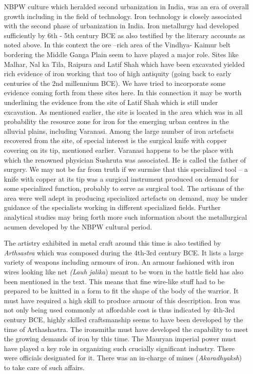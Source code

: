 NBPW culture which heralded second urbanization in India, was an era of overall growth including in the field of technology. Iron technology is closely associated with the second phase of urbanization in India. Iron metallurgy had developed sufficiently by 6th - 5th century BCE as also testified by the literary accounts as noted above. In this context the ore –rich area of the Vindhya- Kaimur belt bordering the Middle Ganga Plain seem to have played a major role. Sites like Malhar, Nal ka Tila, Raipura and Latif Shah which have been excavated yielded rich evidence of iron working that too of high antiquity (going back to early centuries of the 2nd millennium BCE). We have tried to incorporate some evidence coming forth from these sites here. In this connection it may be worth underlining the evidence from the site of Latif Shah which is still under excavation. As mentioned earlier, the site is located in the area which was in all probability the resource zone for iron for the emerging urban centres in the alluvial plains, including Varanasi. Among the large number of iron artefacts recovered from the site, of special interest is the surgical knife with copper covering on its tip, mentioned earlier. Varanasi happens to be the place with which the renowned physician Sushruta was associated. He is called the father of surgery. We may not be far from truth if we surmise that this specialized tool – a knife with copper at its tip was a surgical instrument produced on demand for some specialized function, probably to serve as surgical tool. The artisans of the area were well adept in producing specialized artefacts on demand, may be under guidance of the specialists working in different specialized fields. Further analytical studies may bring forth more such information about the metallurgical acumen developed by the NBPW cultural period.

The artistry exhibited in metal craft around this time is also testified by \textit{Arthsastra} which was composed during the 4th-3rd century BCE. It lists a large variety of weapons including armours of iron. An armour fashioned with iron wires looking like net \textit{(Lauh jalika}) meant to be worn in the battle field has also been mentioned in the text. This means that fine wire-like stuff had to be prepared to be knitted in a form to fit the shape of the body of the warrior. It must have required a high skill to produce armour of this description. Iron was not only being used commonly at affordable cost is thus indicated by 4th-3rd century BCE, highly skilled craftsmanship seems to have been developed by the time of Arthashastra. The ironsmiths must have developed the capability to meet the growing demands of iron by this time. The Mauryan imperial power must have played a key role in organizing such crucially significant industry. There were officials designated for it. There was an in-charge of mines (\textit{Akaradhyaksh}) to take care of such affairs.

